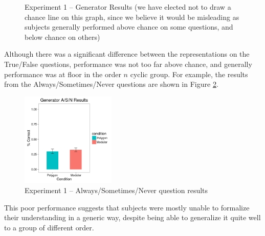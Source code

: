 \documentclass[11pt]{article}
\begin{document}
\begin{figure}[H]
\begin{subfigure}[c]{0.4\textwidth}
\end{subfigure}
\caption{Experiment 1 -- Generator Results (we have elected not to draw a chance line on this graph, since we believe it would be misleading as subjects generally performed above chance on some questions, and below chance on others)}
\label{ex1_gen}
\end{figure}\noindent 
Although there was a significant difference between the representations on the True/False questions, performance was not too far above chance, and generally performance was at floor in the order $n$ cyclic group. For example, the results from the Always/Sometimes/Never questions are shown in Figure \ref{ex1_ASN}.
\begin{figure}[H]
\centering
\includegraphics[width=0.4\textwidth]{figures/1/gen_ASN_r.png}
\caption{Experiment 1 -- Always/Sometimes/Never question results}
\label{ex1_ASN}
\end{figure}\noindent
This poor performance suggests that subjects were mostly unable to formalize their understanding in a generic way, despite being able to generalize it quite well to a group of different order. 
\end{document}
